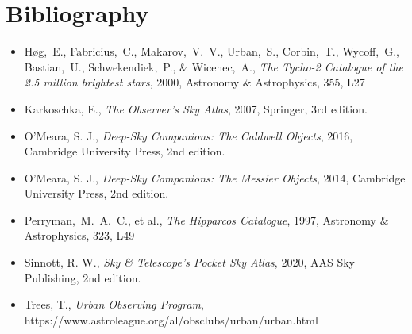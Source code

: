 \chapter*{Bibliography}

\begin{itemize}

\item[] Høg,~E., Fabricius,~C., Makarov,~V.~V., Urban,~S., Corbin,~T., Wycoff,~G., Bastian,~U., Schwekendiek,~P., \& Wicenec,~A., \emph{The Tycho-2 Catalogue of the 2.5 million brightest stars}, 2000, Astronomy \& Astrophysics, 355, L27

\item[] Karkoschka, E., \emph{The Observer’s Sky Atlas},  2007, Springer, 3rd edition.

\item[] O’Meara, S. J., \emph{Deep-Sky Companions: The Caldwell Objects},  2016, Cambridge University Press, 2nd edition.

\item[] O’Meara, S. J., \emph{Deep-Sky Companions: The Messier Objects},  2014, Cambridge University Press, 2nd edition.

\item[] Perryman,~M.~A.~C., et al., \emph{The Hipparcos Catalogue}, 1997,  Astronomy \& Astrophysics, 323, L49

\item[] Sinnott, R. W., \emph{Sky \& Telescope’s Pocket Sky Atlas}, 2020, AAS Sky Publishing, 2nd edition.

\item[] Trees, T., \emph{Urban Observing Program}, \\
https://www.astroleague.org/al/obsclubs/urban/urban.html

\end{itemize}
